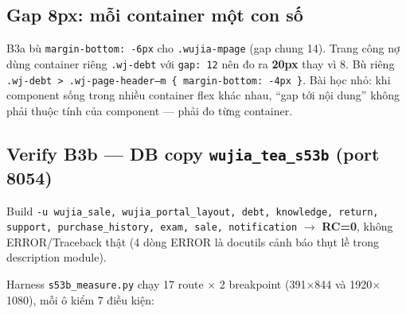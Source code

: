 \subsection{Gap 8px: mỗi container một con số}

B3a bù \texttt{margin-bottom: -6px} cho \texttt{.wujia-mpage} (gap chung 14). Trang công nợ
dùng container riêng \texttt{.wj-debt} với \texttt{gap: 12} nên đo ra \textbf{20px} thay vì 8.
Bù riêng \texttt{.wj-debt > .wj-page-header--m \{ margin-bottom: -4px \}}. Bài học nhỏ: khi
component sống trong nhiều container flex khác nhau, ``gap tới nội dung'' không phải thuộc
tính của component --- phải đo từng container.

\subsection{Verify B3b --- DB copy \texttt{wujia\_tea\_s53b} (port 8054)}

Build \texttt{-u wujia\_sale,\allowbreak{} wujia\_portal\_layout,\allowbreak{} debt,\allowbreak{}
knowledge,\allowbreak{} return,\allowbreak{} support,\allowbreak{} purchase\_history,\allowbreak{}
exam,\allowbreak{} sale,\allowbreak{} notification} $\to$ \textbf{RC=0}, không ERROR/Traceback
thật (4 dòng ERROR là docutils cảnh báo thụt lề trong description module).

Harness \texttt{s53b\_measure.py} chạy 17 route $\times$ 2 breakpoint (391$\times$844 và
1920$\times$1080), mỗi ô kiểm 7 điều kiện:

